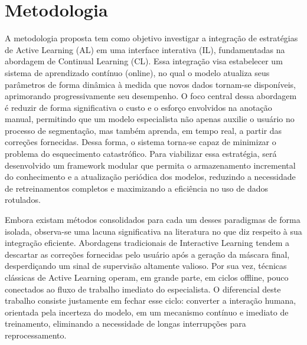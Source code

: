 \chapter{Metodologia}\label{cap_3}

A metodologia proposta tem como objetivo investigar a integração de estratégias de Active Learning (\ac{AL}) em uma interface interativa (\ac{IL}), fundamentadas na abordagem de Continual Learning (\ac{CL}). Essa integração visa estabelecer um sistema de aprendizado contínuo (online), no qual o modelo atualiza seus parâmetros de forma dinâmica à medida que novos dados tornam-se disponíveis, aprimorando progressivamente seu desempenho.
O foco central dessa abordagem é reduzir de forma significativa o custo e o esforço envolvidos na anotação manual, permitindo que um modelo especialista não apenas auxilie o usuário no processo de segmentação, mas também aprenda, em tempo real, a partir das correções fornecidas. Dessa forma, o sistema torna-se capaz de minimizar o problema do esquecimento catastrófico.
Para viabilizar essa estratégia, será desenvolvido um framework modular que permita o armazenamento incremental do conhecimento e a atualização periódica dos modelos, reduzindo a necessidade de retreinamentos completos e maximizando a eficiência no uso de dados rotulados.


Embora existam métodos consolidados para cada um desses paradigmas de forma isolada, observa-se uma lacuna significativa na literatura no que diz respeito à sua integração eficiente. Abordagens tradicionais de Interactive Learning tendem a descartar as correções fornecidas pelo usuário após a geração da máscara final, desperdiçando um sinal de supervisão altamente valioso. Por sua vez, técnicas clássicas de Active Learning operam, em grande parte, em ciclos offline, pouco conectados ao fluxo de trabalho imediato do especialista.
O diferencial deste trabalho consiste justamente em fechar esse ciclo: converter a interação humana, orientada pela incerteza do modelo, em um mecanismo contínuo e imediato de treinamento, eliminando a necessidade de longas interrupções para reprocessamento.

